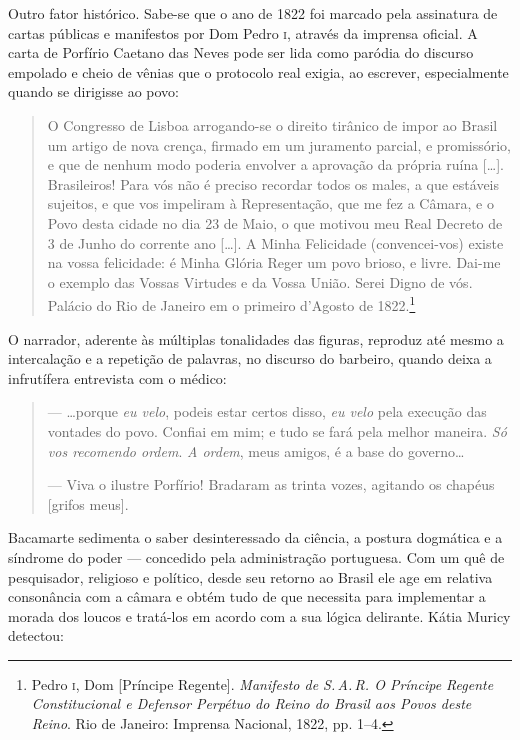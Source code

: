Outro fator histórico. Sabe-se que o ano de 1822 foi marcado pela
assinatura de cartas públicas e manifestos por Dom Pedro \textsc{i}, através da
imprensa oficial. A carta de Porfírio Caetano das Neves pode ser lida
como paródia do discurso empolado e cheio de vênias que o protocolo real
exigia, ao escrever, especialmente quando se dirigisse ao povo:

\begin{quote}
O Congresso de Lisboa arrogando-se o direito tirânico de impor ao Brasil
um artigo de nova crença, firmado em um juramento parcial, e
promissório, e que de nenhum modo poderia envolver a aprovação da
própria ruína {[}\ldots{}{]}. Brasileiros! Para vós não é preciso
recordar todos os males, a que estáveis sujeitos, e que vos impeliram à
Representação, que me fez a Câmara, e o Povo desta cidade no dia 23 de
Maio, o que motivou meu Real Decreto de 3 de Junho do corrente ano
{[}\ldots{}{]}. A Minha Felicidade (convencei-vos) existe na vossa
felicidade: é Minha Glória Reger um povo brioso, e livre. Dai-me o
exemplo das Vossas Virtudes e da Vossa União. Serei Digno de vós.
Palácio do Rio de Janeiro em o primeiro d'Agosto de 1822.\footnote{Pedro
  \textsc{i}, Dom {[}Príncipe Regente{]}. \emph{Manifesto de S.\,A.\,R. O Príncipe
  Regente Constitucional e Defensor Perpétuo do Reino do Brasil aos
  Povos deste Reino}. Rio de Janeiro: Imprensa Nacional, 1822, pp. 1--4.}
\end{quote}

O narrador, aderente às múltiplas tonalidades das figuras, reproduz até
mesmo a intercalação e a repetição de palavras, no discurso do barbeiro,
quando deixa a infrutífera entrevista com o médico:

\begin{quote}
--- \ldots{}porque \emph{eu velo}, podeis estar certos disso, \emph{eu
velo} pela execução das vontades do povo. Confiai em mim; e tudo se fará
pela melhor maneira. \emph{Só vos recomendo ordem}. \emph{A ordem}, meus
amigos, é a base do governo\ldots{}

--- Viva o ilustre Porfírio! Bradaram as trinta vozes, agitando os
chapéus {[}grifos meus{]}.
\end{quote}

Bacamarte sedimenta o saber desinteressado da ciência, a postura
dogmática e a síndrome do poder --- concedido pela administração
portuguesa. Com um quê de pesquisador, religioso e político, desde seu
retorno ao Brasil ele age em relativa consonância com a câmara e obtém
tudo de que necessita para implementar a morada dos loucos e tratá-los
em acordo com a sua lógica delirante. Kátia Muricy detectou:

